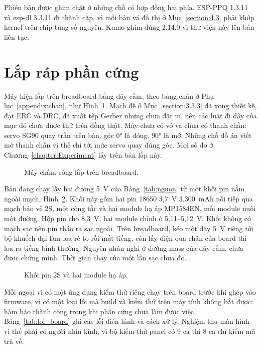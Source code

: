 \documentclass[../DoAn.tex]{subfiles}
\begin{document}
Phiên bản được ghim chặt ở những chỗ có hợp đồng hai phía. ESP-PPQ 1.3.11 và esp-dl 3.3.11
đi thành cặp, vì mỗi bản vá đồ thị ở Mục~\ref{section:4.3} phải khớp kernel trên chip từng
số nguyên. Kumo ghim đúng 2.14.0 vì thư viện này lên bản liên tục.

\section{Lắp ráp phần cứng}
\label{section:4.2}

Máy hiện lắp trên breadboard bằng dây cắm, theo bảng chân ở Phụ lục~\ref{appendix:chan},
như Hình~\ref{fig:ban_lap}. Mạch đế ở Mục~\ref{section:3.3.3} đã xong thiết kế, đạt ERC và
DRC, đã xuất tệp Gerber nhưng chưa đặt in, nên các luật đi dây của mục đó chưa được thử trên
đồng thật. Máy chưa có vỏ và chưa có thanh chắn: servo SG90 quay trần trên bàn, góc 0° là
đóng, 90° là mở. Những chỗ đồ án viết mở thanh chắn vì thế chỉ tới mức servo quay đúng góc.
Mọi số đo ở Chương~\ref{chapter:Experiment} lấy trên bản lắp này.

\begin{figure}[!htb]
\centering
{}
\caption{Máy chấm công lắp trên breadboard.}
\label{fig:ban_lap}
\end{figure}

Bản đang chạy lấy hai đường 5~V của Bảng~\ref{tab:nguon} từ một khối pin nằm ngoài mạch,
Hình~\ref{fig:khoi_pin}. Khối này gồm hai pin 18650 3,7~V 3.300~mAh nối tiếp qua mạch bảo
vệ 2S, một công tắc và hai module hạ áp MP1584EN, mỗi module nuôi một đường. Hộp pin cho 8,3~V, hai module chỉnh ở 5,11--5,12~V. Khối không có mạch sạc nên pin tháo ra sạc ngoài.
Trên breadboard, kéo một dây 5~V riêng tới bộ khuếch đại làm loa rè to rồi mất tiếng, còn lấy điện qua chân của board thì loa ra tiếng bình thường. Nguyên nhân nghi ở đường mass của dây cắm, chưa được chứng minh. Thời gian chạy của một lần sạc chưa đo.

\begin{figure}[!htb]
\centering
{}
\caption{Khối pin 2S và hai module hạ áp.}
\label{fig:khoi_pin}
\end{figure}

Mỗi ngoại vi có một ứng dụng kiểm thử riêng chạy trên board trước khi ghép vào firmware, vì có một loại lỗi mà build và kiểm thử trên máy tính không bắt được: hàm báo thành công trong khi phần cứng chưa làm được việc. Bảng~\ref{tab:loi_board} ghi các lỗi điển hình và cách xử lý. Nghiệm thu màn hình vì thế phải có người
nhìn kính, vì bộ kiểm thử panel có 9 ca thì 8 ca chỉ kiểm mã trả về.
\end{document}
